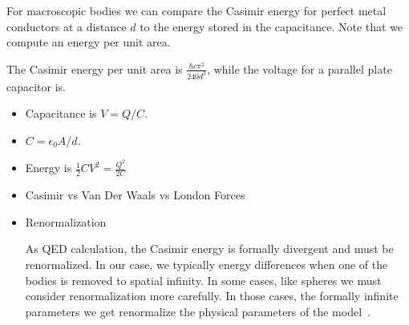 \begin{itemize}
\begin{itemize}
For macroscopic bodies we can compare the Casimir energy for perfect 
metal conductors at a distance $d$ to the energy stored in the capacitance.
  Note that we compute an energy per unit area.  

The Casimir energy per unit area is $\frac{\hbar c\pi^2}{240 d^3}$, while the voltage for a parallel plate capacitor is.
\begin{shaded}
\begin{itemize}
\item Capacitance is $V=Q/C$.  
\item $C = \epsilon_0 A/d$.  
\item Energy is $\frac{1}{2}CV^2=\frac{Q^2}{2C} $
\end{itemize}
\end{shaded}

\end{itemize}


\begin{itemize}
\item Casimir vs Van Der Waals vs London Forces



\item Renormalization

As QED calculation, the Casimir energy is formally divergent and must be renormalized. 
 In our case, we typically energy differences when one of the bodies is 
removed to spatial infinity.
  In some cases, like spheres we must consider renormalization more carefully.
  In those cases, the formally infinite parameters we get renormalize the 
physical parameters of the model~\cite{Milton2001}.  
\end{itemize}


\end{itemize}
